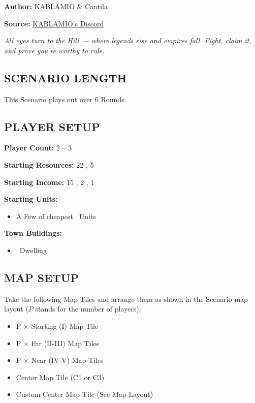 
\begin{multicols}{2}

\textbf{Author:} KABLAMIO \& Cantila

\textbf{Source:} \href{https://discord.com/channels/1275490124301467799/1284428969369665631}{KABLAMIO's Discord}

\textit{All eyes turn to the Hill — where legends rise and empires fall. Fight, claim it, and prove you’re worthy to rule.}

\subsection*{\MakeUppercase{Scenario Length}}
This Scenario plays out over 6 Rounds.

\subsection*{\MakeUppercase{Player Setup}}
\textbf{Player Count:} 2 -- 3

\textbf{Starting Resources:} 22 , 5 

\textbf{Starting Income:} 15 , 2 , 1 

\textbf{Starting Units:}
\begin{itemize}
  \item A Few of cheapest \silver\ Units
\end{itemize}

\textbf{Town Buildings:}
\begin{itemize}
  \item \bronze\ Dwelling
\end{itemize}

\subsection*{\MakeUppercase{Map Setup}}
Take the following Map Tiles and arrange them as shown in the Scenario map layout ($P$ stands for the number of players):

\begin{itemize}
  \item P × Starting (I) Map Tile
  \item P × Far (II-III) Map Tiles
  \item P × Near (IV-V) Map Tiles
  \item Center Map Tile (C1 or C3)
  \item Custom Center Map Tile (See Map Layout)
\end{itemize}


\end{multicols}
